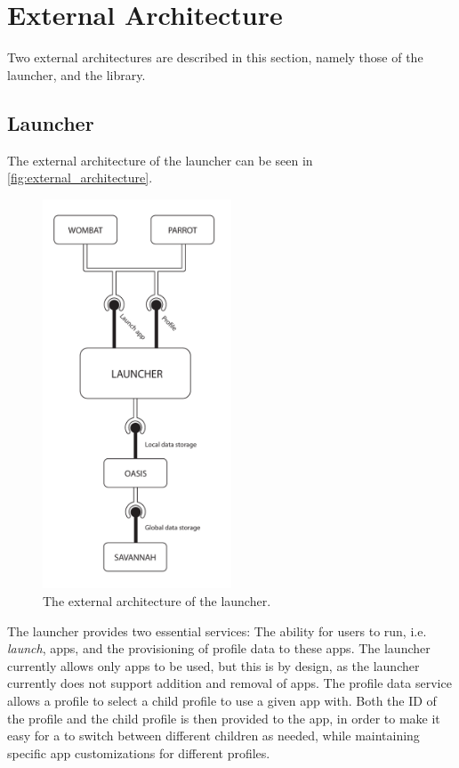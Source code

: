 \section{External Architecture}
Two external architectures are described in this section, namely those of the \giraf[] launcher, and the \guicomponents[] library.

\subsection{\giraf[] Launcher}
\label{sec:launcher_architecture}
The external architecture of the launcher can be seen in \autoref{fig:external_architecture}.
\begin{figure}[h]
	\centering
	\includegraphics[width=0.5\textwidth]{gfx/external_architecture.pdf}
	\caption{The external architecture of the \giraf[] launcher.}
	\label{fig:external_architecture}
\end{figure}
The launcher provides two essential services: The ability for users to run, i.e. \textit{launch}, apps, and the provisioning of profile data to these apps. 
The launcher currently allows only \giraf[] apps to be used, but this is by design, as the launcher currently does not support addition and removal of apps. 
The profile data service allows a \guardian[] profile to select a child profile to use a given app with. 
Both the ID of the \guardian[] profile and the child profile is then provided to the app, in order to make it easy for a \guardian[] to switch between different children as needed, while maintaining specific app customizations for different profiles. \newline

